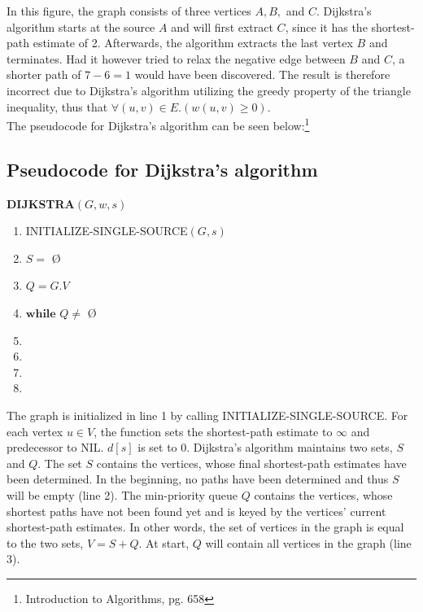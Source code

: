 \documentclass[11pt]{article}
\begin{document}
\noindent In this figure, the graph consists of three vertices $A, B,$ and $C$. Dijkstra's algorithm starts at the source $A$ and will first extract $C$, since it has the shortest-path estimate of 2. Afterwards, the algorithm extracts the last vertex $B$ and terminates. Had it however tried to relax the negative edge between $B$ and $C$, a shorter path of $7 - 6 = 1$ would have been discovered. The result is therefore incorrect due to Dijkstra's algorithm utilizing the greedy property of the triangle inequality, thus that $\forall (u,v) \in E.(w(u,v) \geq 0)$. \\

\noindent The pseudocode for Dijkstra's algorithm can be seen below:\footnote{Introduction to Algorithms, pg. 658}
\subsection{Pseudocode for Dijkstra's algorithm}

\hspace{4ex}\textbf{DIJKSTRA$(G, w, s)$}
\begin{enumerate}
\setlength\itemsep{0em}
\item INITIALIZE-SINGLE-SOURCE$(G, s)$
\item $S = $ \O
\item $Q = G.V$
\item $\textbf{while } Q \neq$ \O
\item {}
\item {}
\item {}
\item \tab{}
\end{enumerate}

\noindent The graph is initialized in line 1 by calling INITIALIZE-SINGLE-SOURCE. For each vertex $u \in V$, the function sets the shortest-path estimate to $\infty$ and predecessor to NIL. $d[s]$ is set to 0. Dijkstra's algorithm maintains two sets, $S$ and $Q$. The set $S$ contains the vertices, whose final shortest-path estimates have been determined. In the beginning, no paths have been determined and thus $S$ will be empty (line 2). The min-priority queue $Q$ contains the vertices, whose shortest paths have not been found yet and is keyed by the vertices' current shortest-path estimates. In other words, the set of vertices in the graph is equal to the two sets, $V = S + Q$. At start, $Q$ will contain all vertices in the graph (line 3).\\
\end{document}
